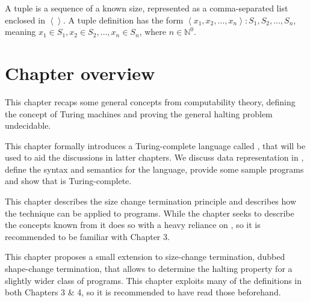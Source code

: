 \begin{definition} A tuple is a sequence of a known size, represented as a
comma-separated list enclosed in $\left\langle \right\rangle$. A tuple
definition has the form $\left\langle x_1,x_2,\ldots,x_n \right\rangle : S_1,
S_2, \ldots, S_n$, meaning $x_1\in S_1, x_2\in S_2, \ldots, x_n\in S_n$, where
$n\in\mathbb{N}^0$.\end{definition}

\section{Chapter overview}

\begin{description}[\setleftmargin{70pt}\setlabelstyle{\bf}]

\item [Chapter 2] This chapter recaps some general concepts from computability
theory, defining the concept of Turing machines and proving the general halting
problem undecidable.

\item [Chapter 3] This chapter formally introduces a Turing-complete language
called \D{}, that will be used to aid the discussions in latter chapters. We
discuss data representation in \D{}, define the syntax and semantics for the
language, provide some sample programs and show that \D{} is Turing-complete.

\item [Chapter 4] This chapter describes the size change termination principle
and describes how the technique can be applied to \D{} programs. While the
chapter seeks to describe the concepts known from \cite{size-change} it does so
with a heavy reliance on \D{}, so it is recommended to be familiar with Chapter
3.

\item [Chapter 5] This chapter proposes a small extension to size-change
termination, dubbed shape-change termination, that allows to determine the
halting property for a slightly wider class of programs. This chapter exploits
many of the definitions in both Chapters 3 \& 4, so it is recommended to have
read those beforehand.

\end{description}
